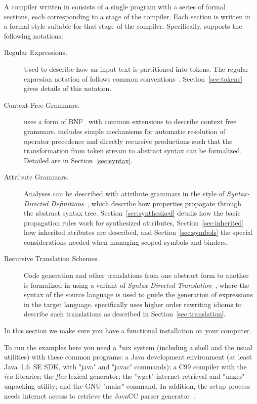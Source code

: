\documentclass[11pt]{article} %
\begin{document}
A compiler written in \HAX consists of a single program with a series of formal sections, each
corresponding to a stage of the compiler.  Each section is written in a formal style suitable for
that stage of the compiler. Specifically, \HAX supports the following notations:
\begin{description}

\item[Regular Expressions.] Used to describe how an input text is partitioned into tokens. The
  regular expresion notation of \HAX follows common
  conventions~\cite{Aho+:2006}. Section~\ref{sec:tokens} gives details of this notation.

\item[Context Free Grammars.] \HAX uses a form of BNF~\cite{NaurEtal:cacm1960} with common
  extensions to describe context free grammars. \HAX includes simple mechanisms for automatic
  resolution of operator precedence and directly recursive productions such that the transformation
  from token stream to abstract syntax can be formalized.  Detailed are in Section~\ref{sec:syntax}.

\item[Attribute Grammars.] Analyses can be described with attribute grammars in the style of
  \emph{Syntax-Directed Definitions}~\cite{Aho+:2006}, which describe how properties propagate
  through the abstract syntax tree.  Section~\ref{sec:synthesized} details how the basic propagation
  rules work for synthesized attributes, Section~\ref{sec:inherited} how inherited atributes are
  described, and Section~\ref{sec:symbols} the special considerations needed when managing scoped
  symbols and binders.

\item[Recursive Translation Schemes.] Code generation and other translations from one abstract form
  to another is formalized in \HAX using a variant of \emph{Syntax-Directed
    Translation}~\cite{Aho+:2006}, where the syntax of the source language is used to guide the
  generation of expressions in the target language. \HAX specifically uses higher order rewriting
  idioms to describe such translations as described in Section~\ref{sec:translation}.

\end{description}




In this section we make sure you have a functional \HAX installation on your computer.

\begin{requirements}
  To run the \HAX examples here you need a *nix system (including a shell and the usual utilities)
  with these common programs: a Java development environment (at
  least Java~1.6~SE SDK, with "java" and "javac" commands); a C99 compiler with the \emph{icu}
  libraries; the \emph{flex} lexical generator; the "wget" internet retrieval and "unzip" unpacking
  utility; and the GNU "make" command.  In addition, the setup process needs internet access to retrieve
  the JavaCC parser generator~\cite{javacc}.
\end{requirements}
\end{document}
